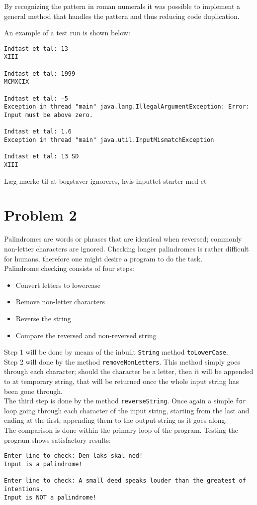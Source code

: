 \documentclass{scrartcl}
\newcommand\code[1]{\texttt{#1}}
\begin{document}
By recognizing the pattern in roman numerals it was possible to implement a general method that handles the pattern and thus reducing code duplication.

An example of a test run is shown below:

\begin{Verbatim}
Indtast et tal: 13
XIII

Indtast et tal: 1999
MCMXCIX

Indtast et tal: -5
Exception in thread "main" java.lang.IllegalArgumentException: Error: Input must be above zero.

Indtast et tal: 1.6
Exception in thread "main" java.util.InputMismatchException

Indtast et tal: 13 SD
XIII
\end{Verbatim}

Læg mærke til at bogstaver ignoreres, hvis inputtet starter med et

\section*{Problem 2}
Palindromes are words or phrases that are identical when reversed; commonly non-letter characters are ignored. Checking longer palindromes is rather difficult for humans, therefore one might desire a program to do the task.\\ Palindrome checking consists of four steps:
\begin{itemize}
\item Convert letters to lowercase
\item Remove non-letter characters
\item Reverse the string
\item Compare the reversed and non-reversed string
\end{itemize}
Step 1 will be done by means of the inbuilt \code{String} method \code{toLowerCase}. \\
Step 2 will done by the method \code{removeNonLetters}. This method simply goes through each character; should the character be a letter, then it will be appended to at temporary string, that will be returned once the whole input string has been gone through.\\
The third step is done by the method \code{reverseString}. Once again a simple \code{for} loop going through each character of the input string, starting from the last and ending at the first, appending them to the output string as it goes along.\\
The comparison is done within the primary loop of the program.
Testing the program shows satisfactory results:
\begin{Verbatim}
Enter line to check: Den laks skal ned!
Input is a palindrome!

Enter line to check: A small deed speaks louder than the greatest of intentions.
Input is NOT a palindrome!
\end{Verbatim}
\end{document}
